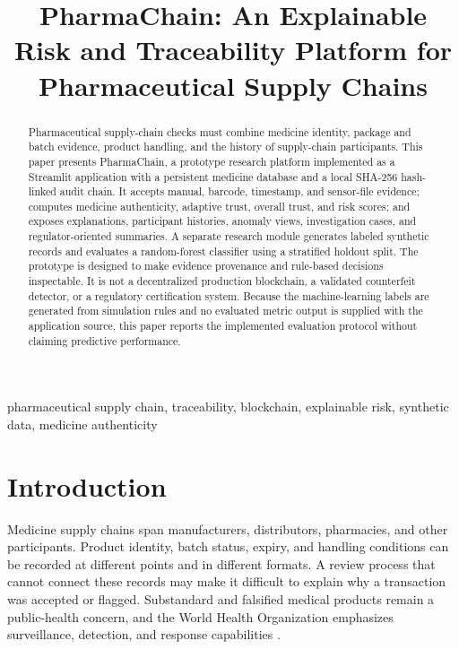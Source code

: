 \documentclass[conference]{IEEEtran}
\begin{document}
\title{PharmaChain: An Explainable Risk and Traceability Platform for Pharmaceutical Supply Chains}

\author{
}

\maketitle

\begin{abstract}
Pharmaceutical supply-chain checks must combine medicine identity, package and batch evidence, product handling, and the history of supply-chain participants. This paper presents PharmaChain, a prototype research platform implemented as a Streamlit application with a persistent medicine database and a local SHA-256 hash-linked audit chain. It accepts manual, barcode, timestamp, and sensor-file evidence; computes medicine authenticity, adaptive trust, overall trust, and risk scores; and exposes explanations, participant histories, anomaly views, investigation cases, and regulator-oriented summaries. A separate research module generates labeled synthetic records and evaluates a random-forest classifier using a stratified holdout split. The prototype is designed to make evidence provenance and rule-based decisions inspectable. It is not a decentralized production blockchain, a validated counterfeit detector, or a regulatory certification system. Because the machine-learning labels are generated from simulation rules and no evaluated metric output is supplied with the application source, this paper reports the implemented evaluation protocol without claiming predictive performance.
\end{abstract}

\begin{IEEEkeywords}
pharmaceutical supply chain, traceability, blockchain, explainable risk, synthetic data, medicine authenticity
\end{IEEEkeywords}

\section{Introduction}
Medicine supply chains span manufacturers, distributors, pharmacies, and other participants. Product identity, batch status, expiry, and handling conditions can be recorded at different points and in different formats. A review process that cannot connect these records may make it difficult to explain why a transaction was accepted or flagged. Substandard and falsified medical products remain a public-health concern, and the World Health Organization emphasizes surveillance, detection, and response capabilities \cite{who}.
\end{document}
